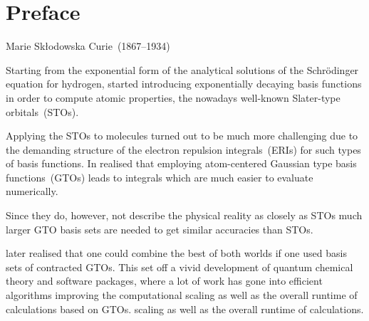 \chapter{Preface}
{Marie Skłodowska Curie~(1867--1934)}



Starting from the exponential form of the analytical solutions of the
Schrödinger equation for hydrogen,
\citet{Slater1930} started introducing exponentially decaying basis functions
in order to compute atomic properties,
the nowadays well-known Slater-type orbitals~(STOs).

Applying the STOs to molecules turned out to be much more
challenging due to the demanding structure of the electron repulsion integrals~(ERIs)
for such types of basis functions.
In \citeyear{Boys1950} \citeauthor{Boys1950} realised that employing
atom-centered Gaussian type basis functions~(GTOs) leads to integrals
which are much easier to evaluate numerically.

Since they do, however, not describe the physical reality as closely as STOs
much larger GTO basis sets are needed to get similar accuracies than STOs.

\citet{Hehre1969} later realised that one could combine the best of both
worlds if one used
basis sets of contracted GTOs.
This set off a vivid development of quantum chemical theory and software packages,
where a lot of work has gone into efficient algorithms
improving the computational
scaling as well as the overall runtime of calculations based on GTOs.
scaling as well as the overall runtime of calculations.

